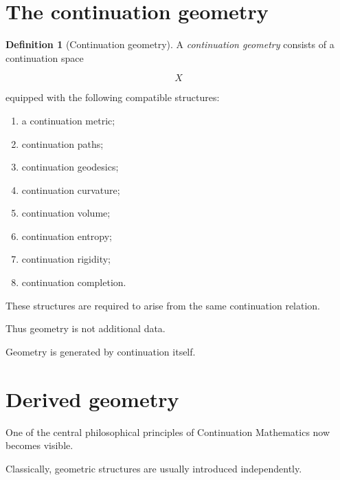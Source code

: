 \documentclass[13pt,openany]{book}
\theoremstyle{plain}
\theoremstyle{definition}
\newtheorem{definition}{Definition}[chapter]
\begin{document}

\section{The continuation geometry}

\begin{definition}[Continuation geometry]

A \emph{continuation geometry} consists of a continuation space

\[
X
\]

equipped with the following compatible structures:

\begin{enumerate}
\item a continuation metric;

\item continuation paths;

\item continuation geodesics;

\item continuation curvature;

\item continuation volume;

\item continuation entropy;

\item continuation rigidity;

\item continuation completion.
\end{enumerate}

These structures are required to arise from the same continuation relation.

\end{definition}

Thus geometry is not additional data.

Geometry is generated by continuation itself.


\section{Derived geometry}

One of the central philosophical principles of Continuation Mathematics now becomes visible.

Classically, geometric structures are usually introduced independently.
\end{document}
